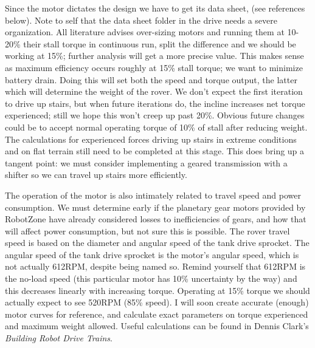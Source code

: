 \documentclass[a4paper, 10pt]{article}
\begin{document}
		Since the motor dictates the design we have to get its data sheet, (see references below). Note to self that the data sheet folder in the drive needs a severe organization. All literature advises over-sizing motors and running them at 10-20\% their stall torque in continuous run, split the difference and we should be working at 15\%; further analysis will get a more precise value. This makes sense as maximum efficiency occurs roughly at 15\% stall torque; we want to minimize battery drain. Doing this will set both the speed and torque output, the latter which will determine the weight of the rover. We don't expect the first iteration to drive up stairs, but when future iterations do, the incline increases net torque experienced; still we hope this won't creep up past 20\%. Obvious future changes could be to accept normal operating torque of 10\% of stall after reducing weight. The calculations for experienced forces driving up stairs in extreme conditions and on flat terrain still need to be completed at this stage. This does bring up a tangent point: we must consider implementing a geared transmission with a shifter so we can travel up stairs more efficiently. 
		
		The operation of the motor is also intimately related to travel speed and power consumption. We must determine early if the planetary gear motors provided by RobotZone have already considered losses to inefficiencies of gears, and how that will affect power consumption, but not sure this is possible. The rover travel speed is based on the diameter and angular speed of the tank drive sprocket. The angular speed of the tank drive sprocket is the motor's angular speed, which is not actually 612RPM, despite being named so. Remind yourself that 612RPM is the no-load speed (this particular motor has 10\% uncertainty by the way) and this decreases linearly with increasing torque. Operating at 15\% torque we should actually expect to see 520RPM (85\% speed). I will soon create accurate (enough) motor curves for reference, and calculate exact parameters on torque experienced and maximum weight allowed. Useful calculations can be found in Dennis Clark's \textit{Building Robot Drive Trains}. 
		
\end{document}
